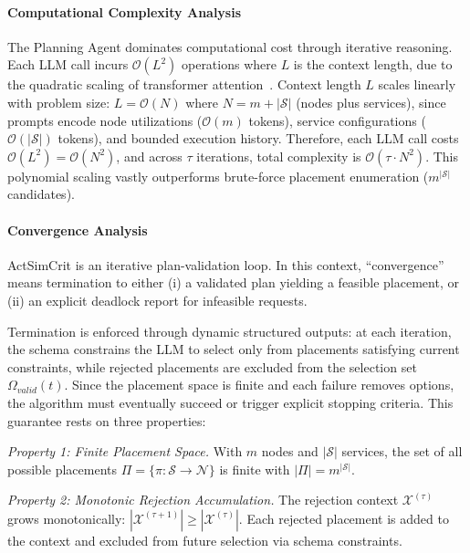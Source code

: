 \paragraph{Computational Complexity Analysis}
The Planning Agent dominates computational cost through iterative reasoning. Each \ac{LLM} call incurs $\mathcal{O}(L^2)$ operations where $L$ is the context length, due to the quadratic scaling of transformer attention~\cite{vaswani2017attention, deepseekai2025deepseekv32pushingfrontieropen}. Context length $L$ scales linearly with problem size: $L = \mathcal{O}(N)$ where $N = m + |\mathcal{S}|$ (nodes plus services), since prompts encode node utilizations ($\mathcal{O}(m)$ tokens), service configurations ($\mathcal{O}(|\mathcal{S}|)$ tokens), and bounded execution history. Therefore, each \ac{LLM} call costs $\mathcal{O}(L^2) = \mathcal{O}(N^2)$, and across $\tau$ iterations, total complexity is $\mathcal{O}(\tau \cdot N^2)$. This polynomial scaling vastly outperforms brute-force placement enumeration ($m^{|\mathcal{S}|}$ candidates).

\paragraph{Convergence Analysis}
\ac{ActSimCrit} is an iterative plan-validation loop. In this context, ``convergence'' means termination to either (i) a validated plan yielding a feasible placement, or (ii) an explicit deadlock report for infeasible requests.

Termination is enforced through dynamic structured outputs: at each iteration, the schema constrains the \ac{LLM} to select only from placements satisfying current constraints, while rejected placements are excluded from the selection set $\Omega_{valid}(t)$. Since the placement space is finite and each failure removes options, the algorithm must eventually succeed or trigger explicit stopping criteria. This guarantee rests on three properties:

\textit{Property 1: Finite Placement Space.} With $m$ nodes and $|\mathcal{S}|$ services, the set of all possible placements $\Pi = \{\pi: \mathcal{S} \to \mathcal{N}\}$ is finite with $|\Pi| = m^{|\mathcal{S}|}$.

\textit{Property 2: Monotonic Rejection Accumulation.} The rejection context $\mathcal{X}^{(\tau)}$ grows monotonically: $|\mathcal{X}^{(\tau+1)}| \geq |\mathcal{X}^{(\tau)}|$. Each rejected placement is added to the context and excluded from future selection via schema constraints.

